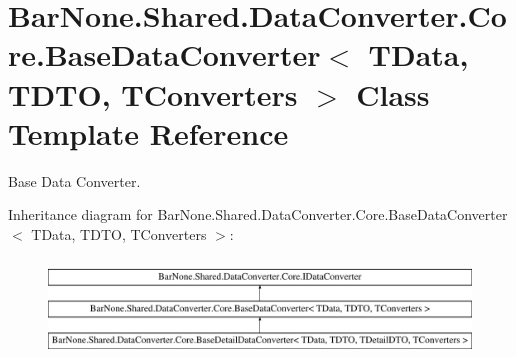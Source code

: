 \hypertarget{class_bar_none_1_1_shared_1_1_data_converter_1_1_core_1_1_base_data_converter}{}\section{Bar\+None.\+Shared.\+Data\+Converter.\+Core.\+Base\+Data\+Converter$<$ T\+Data, T\+D\+TO, T\+Converters $>$ Class Template Reference}
\label{class_bar_none_1_1_shared_1_1_data_converter_1_1_core_1_1_base_data_converter}


Base Data Converter.  


Inheritance diagram for Bar\+None.\+Shared.\+Data\+Converter.\+Core.\+Base\+Data\+Converter$<$ T\+Data, T\+D\+TO, T\+Converters $>$\+:\begin{figure}[H]
\begin{center}
\leavevmode
\includegraphics[height=2.654028cm]{class_bar_none_1_1_shared_1_1_data_converter_1_1_core_1_1_base_data_converter}
\end{center}
\end{figure}
